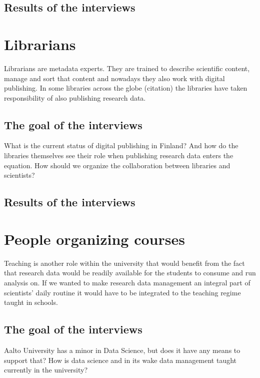 \subsection{Results of the interviews}

\section{Librarians}

Librarians are metadata experts. They are trained to describe scientific
content, manage and sort that content and nowadays they also work with digital
publishing. In some libraries across the globe (citation) the libraries have
taken responsibility of also publishing research data.

\subsection{The goal of the interviews}

What is the current status of digital publishing in Finland? And how do the
libraries themselves see their role when publishing research data enters the
equation. How should we organize the collaboration between libraries and
scientists?

\subsection{Results of the interviews}

\section{People organizing courses}

Teaching is another role within the university that would benefit from the fact
that research data would be readily available for the students to consume and
run analysis on. If we wanted to make research data management an integral part
of scientists' daily routine it would have to be integrated to the teaching
regime taught in schools.

\subsection{The goal of the interviews}

Aalto University has a minor in Data Science, but does it have any means to
support that? How is data science and in its wake data management taught
currently in the university?

